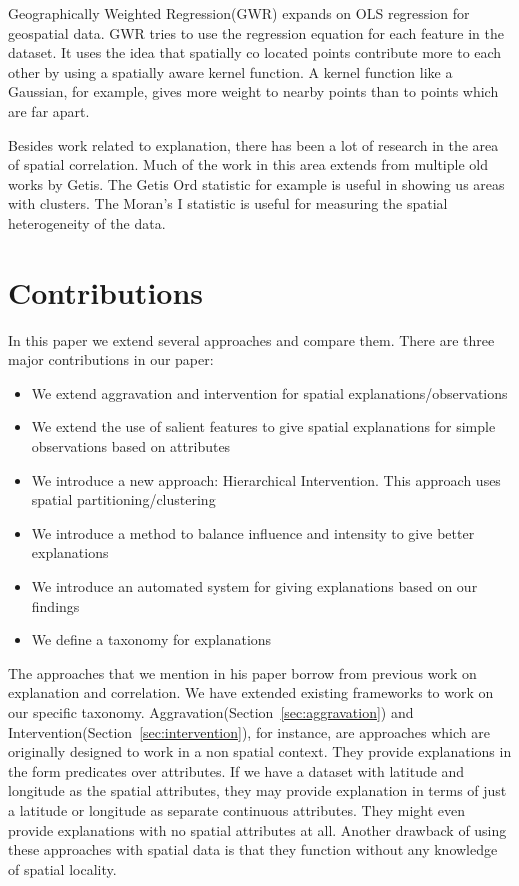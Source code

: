 Geographically Weighted Regression(GWR) expands on OLS regression for geospatial data\citep{brunsdon1998geographically,charlton2009geographically}. GWR tries to use the regression equation for each feature in the dataset. It uses the idea that spatially co located points contribute more to each other by using a spatially aware kernel function. A kernel function like a Gaussian, for example, gives more weight to nearby points than to points which are far apart.

Besides work related to explanation, there has been a lot of research in the area of spatial correlation. Much of the work in this area extends from multiple old works by Getis\citep{getis1991spatial,ord1995local,getis1996local,getis2002comparative,getis2007reflections}. The Getis Ord statistic \citep{ord1995local} for example is useful in showing us areas with clusters. The Moran's I statistic is useful for measuring the spatial heterogeneity of the data. 

\section{Contributions}

In this paper we extend several approaches and compare them. There are three major contributions in our paper:
\begin{itemize}
\item We extend aggravation and intervention for spatial explanations/observations
\item We extend the use of salient features to give spatial explanations for simple observations based on attributes
\item We introduce a new approach: Hierarchical Intervention. This approach uses spatial partitioning/clustering
\item We introduce a method to balance influence and intensity to give better explanations
\item We introduce an automated system for giving explanations based on our findings
\item We define a taxonomy for explanations
\end{itemize}

The approaches that we mention in his paper borrow from previous work on explanation and correlation. We have extended existing frameworks to work on our specific taxonomy. Aggravation(Section~\ref{sec:aggravation}) and Intervention(Section~\ref{sec:intervention}), for instance, are approaches which are originally designed to work in a non spatial context. They provide explanations in the form predicates over attributes. If we have a dataset with latitude and longitude as the spatial attributes, they may provide explanation in terms of just a latitude or longitude as separate continuous attributes. They might even provide explanations with no spatial attributes at all. Another drawback of using these approaches with spatial data is that they function without any knowledge of spatial locality. 

